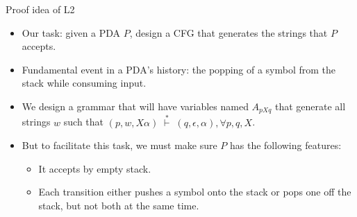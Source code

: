 \documentclass{prosper}%
\newcommand{\e} {{\mbox{$\epsilon$}}}
\newcommand{\ra}{\mbox{$\;\rightarrow\;$}}
\newcommand{\cvd}{\mbox{$\;\overset{*}{\vdash}\;$}}
\begin{document}
\begin{slide}{Proof idea of L2}

\begin{itemize}
\item Our task: given a PDA $P$,  design a CFG that generates the strings that $P$ accepts.
\item Fundamental event in a PDA's history: the popping of a symbol from the stack while consuming input. 
\item We design a grammar that will have variables named {\blue\bf $A_{pXq}$} that generate all strings $w$ such that $(p, w, X\alpha) \cvd (q, \e, \alpha), \forall p, q, X$.
\item But to facilitate this task, we must make sure $P$  has the following features:
\begin{itemize}
\item It accepts by empty stack.
\item Each transition either pushes a symbol onto the stack or pops one off the stack, but not both at the same time.
\end{itemize}
\end{itemize}
\end{slide}

\end{document}
